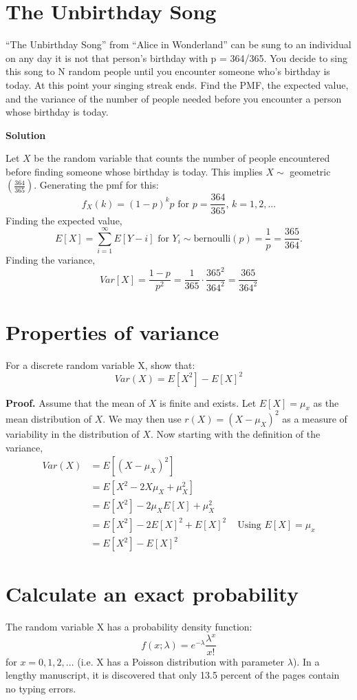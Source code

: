 \documentclass[12pt]{article}
\begin{document}
\section{The Unbirthday Song}
“The Unbirthday Song” from “Alice in Wonderland” can be sung to an individual on any day it is not that person’s birthday with p = 364/365. You decide to sing this song to N random people until you encounter someone who’s birthday is today. At this point your singing streak ends. Find the PMF, the expected value, and the variance of the number of people needed before you encounter a person whose birthday is today.

\textbf{Solution}

Let $X$ be the random variable that counts the number of people encountered before finding someone whose birthday is today. This implies $X \sim $ geometric$(\frac{364}{365})$. Generating the pmf for this:
\[ f_X(k) = (1-p)^kp \text{ for } p=\frac{364}{365}\text{, }k=1,2,...\]
Finding the expected value, 
\[ E[X] = \sum_{i=1}^\infty E[Y-i] \text{ for } Y_i \sim \text{bernoulli}(p) = \frac{1}{p} = \frac{365}{364}.\]
Finding the variance, 
\[ Var[X] = \frac{1-p}{p^2} = \frac{1}{365}\cdot \frac{365^2}{364^2} = \frac{365}{364^2}\]

\section{Properties of variance}
For a discrete random variable X, show that:
\[ Var(X) = E[X^2]-E[X]^2\]

\textbf{Proof.} Assume that the mean of $X$ is finite and exists. Let $E[X]=\mu_x$ as the mean distribution of $X$. We may then use $r(X) = (X - \mu_X)^2$ as a measure of variability in the distribution of $X$. Now starting with the definition of the variance, 
\begin{align*}
    Var(X) &= E[(X-\mu_X)^2]
    \\ &= E[X^2 - 2X\mu_X +\mu_X^2]
    \\ &= E[X^2] - 2\mu_X E[X] + \mu_X^2
    \\ &= E[X^2] -2E[X]^2 + E[X]^2      & \text{ Using }E[X]=\mu_x
    \\ &= E[X^2]-E[X]^2
\end{align*}

\section{Calculate an exact probability}
The random variable X has a probability density function:
\[ f(x;\lambda) = e^{-\lambda}\frac{\lambda^x}{x!}\]
for $x=0,1,2,...$ (i.e. X has a Poisson distribution with parameter $\lambda$). In a lengthy manuscript, it is
discovered that only 13.5 percent of the pages contain no typing errors.
\end{document}
